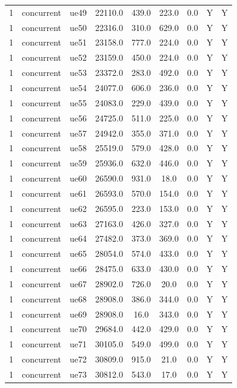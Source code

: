 \begin{table}[ht]
\begin{tabular}{|c|c|c|c|c|c|c|c|c|}
1 & concurrent & ue49 & 22110.0 & 439.0 & 223.0 & 0.0 & Y & Y \\
1 & concurrent & ue50 & 22316.0 & 310.0 & 629.0 & 0.0 & Y & Y \\
1 & concurrent & ue51 & 23158.0 & 777.0 & 224.0 & 0.0 & Y & Y \\
1 & concurrent & ue52 & 23159.0 & 450.0 & 224.0 & 0.0 & Y & Y \\
1 & concurrent & ue53 & 23372.0 & 283.0 & 492.0 & 0.0 & Y & Y \\
1 & concurrent & ue54 & 24077.0 & 606.0 & 236.0 & 0.0 & Y & Y \\
1 & concurrent & ue55 & 24083.0 & 229.0 & 439.0 & 0.0 & Y & Y \\
1 & concurrent & ue56 & 24725.0 & 511.0 & 225.0 & 0.0 & Y & Y \\
1 & concurrent & ue57 & 24942.0 & 355.0 & 371.0 & 0.0 & Y & Y \\
1 & concurrent & ue58 & 25519.0 & 579.0 & 428.0 & 0.0 & Y & Y \\
1 & concurrent & ue59 & 25936.0 & 632.0 & 446.0 & 0.0 & Y & Y \\
1 & concurrent & ue60 & 26590.0 & 931.0 & 18.0 & 0.0 & Y & Y \\
1 & concurrent & ue61 & 26593.0 & 570.0 & 154.0 & 0.0 & Y & Y \\
1 & concurrent & ue62 & 26595.0 & 223.0 & 153.0 & 0.0 & Y & Y \\
1 & concurrent & ue63 & 27163.0 & 426.0 & 327.0 & 0.0 & Y & Y \\
1 & concurrent & ue64 & 27482.0 & 373.0 & 369.0 & 0.0 & Y & Y \\
1 & concurrent & ue65 & 28054.0 & 574.0 & 433.0 & 0.0 & Y & Y \\
1 & concurrent & ue66 & 28475.0 & 633.0 & 430.0 & 0.0 & Y & Y \\
1 & concurrent & ue67 & 28902.0 & 726.0 & 20.0 & 0.0 & Y & Y \\
1 & concurrent & ue68 & 28908.0 & 386.0 & 344.0 & 0.0 & Y & Y \\
1 & concurrent & ue69 & 28908.0 & 16.0 & 343.0 & 0.0 & Y & Y \\
1 & concurrent & ue70 & 29684.0 & 442.0 & 429.0 & 0.0 & Y & Y \\
1 & concurrent & ue71 & 30105.0 & 549.0 & 499.0 & 0.0 & Y & Y \\
1 & concurrent & ue72 & 30809.0 & 915.0 & 21.0 & 0.0 & Y & Y \\
1 & concurrent & ue73 & 30812.0 & 543.0 & 17.0 & 0.0 & Y & Y \\

\end{tabular}
\end{table}
